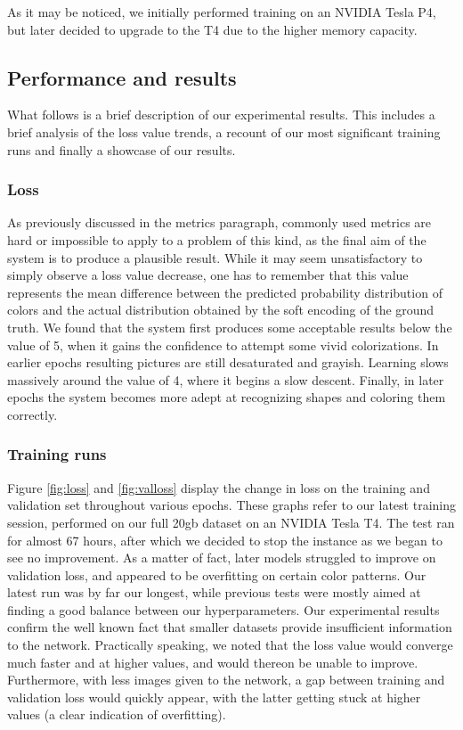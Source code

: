 \documentclass[twoside,twocolumn]{article}
\begin{document}
As it may be noticed, we initially performed training on an NVIDIA Tesla P4, but later decided to upgrade to the T4 due to the higher memory capacity.


\subsection{Performance and results}

What follows is a brief description of our experimental results. This includes a brief analysis of the loss value trends, a recount of our most significant training runs and finally a showcase of our results.

\subsubsection{Loss}

As previously discussed in the metrics paragraph, commonly used metrics are hard or impossible to apply to a problem of this kind, as the final aim of the system is to produce a plausible result. While it may seem unsatisfactory to simply observe a loss value decrease, one has to remember that this value represents the mean difference between the predicted probability distribution of colors and the actual distribution obtained by the soft encoding of the ground truth.
We found that the system first produces some acceptable results below the value of 5, when it gains the confidence to attempt some vivid colorizations. In earlier epochs resulting pictures are still desaturated and grayish. Learning slows massively around the value of 4, where it begins a slow descent. Finally, in later epochs the system becomes more adept at recognizing shapes and coloring them correctly.

\subsubsection{Training runs}

Figure \ref{fig:loss} and \ref{fig:valloss} display the change in loss on the training and validation set throughout various epochs. These graphs refer to our latest training session, performed on our full 20gb dataset on an NVIDIA Tesla T4. The test ran for almost 67 hours, after which we decided to stop the instance as we began to see no improvement. As a matter of fact, later models struggled to improve on validation loss, and appeared to be overfitting on certain color patterns.
Our latest run was by far our longest, while previous tests were mostly aimed at finding a good balance between our hyperparameters. Our experimental results confirm the well known fact that smaller datasets provide insufficient information to the network. Practically speaking, we noted that the loss value would converge much faster and at higher values, and would thereon be unable to improve. Furthermore, with less images given to the network, a gap between training and validation loss would quickly appear, with the latter getting stuck at higher values (a clear indication of overfitting).
\end{document}
